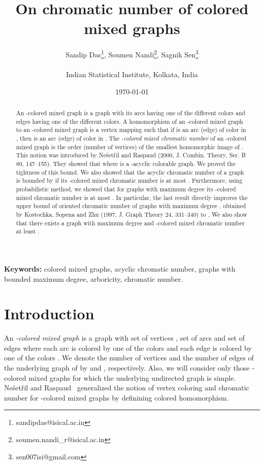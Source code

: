 \documentclass[11pt]{article}
\begin{document}
\title{{\bf On chromatic number of colored mixed graphs}}
\author{
{\sc Sandip Das\footnote{{\small sandipdas@isical.ac.in}}}, {\sc Soumen Nandi\footnote{{\small soumen.nandi\_r@isical.ac.in}}}, {\sc Sagnik Sen\footnote{{\small sen007isi@gmail.com}}}\\
\mbox{}\\
{\small Indian Statistical Institute, Kolkata, India}\\
}




\date{\today}

\maketitle

\begin{abstract}
An -colored mixed graph  is a graph  with its arcs having one of the  different colors and edges having one of the  different colors. A homomorphism  of an -colored mixed graph    to an  -colored mixed graph  is a vertex mapping such that if  is an arc (edge) of color  in , then  is an arc (edge) of  color  in . The \textit{-colored mixed chromatic number}  of an   -colored mixed graph  is the 
order (number of vertices)
of the smallest homomorphic image of . This notion was introduced by 
Ne\v{s}et\v{r}il and Raspaud (2000,  J. Combin. Theory, Ser. B 80, 147--155). 
They showed that  where  is a -acyclic colorable graph.  We proved the tightness of this bound. 
We also showed that the acyclic chromatic number of a graph is bounded by  if its 
-colored mixed chromatic number is at most .  
Furthermore, using probabilistic method, we showed that for graphs with maximum degree  its -colored mixed chromatic number is at most 
. 
In particular, the last result directly improves the upper bound   of oriented chromatic number of 
graphs with  maximum degree , obtained by Kostochka, Sopena and Zhu (1997, J. Graph Theory 24, 331--340)  to . 
We also show that there exists a graph with maximum degree  and -colored mixed chromatic number at least . 
 \end{abstract}


\noindent \textbf{Keywords:} colored mixed graphs, acyclic chromatic number, graphs with bounded maximum degree, arboricity, chromatic number.


\section{Introduction}
An \textit{-colored mixed graph}  is a graph  with set of vertices , set of arcs  and set of edges  where each arc is 
 colored by one of the  colors  and each edge is  colored by one of the  colors . We denote  the number of vertices and the number of edges of the underlying graph of  by   and , respectively.
Also, we will consider only those 
-colored mixed graphs for which the underlying undirected graph is simple.
Ne\v{s}et\v{r}il and Raspaud~\cite{raspaud_and_nesetril} generalized the notion of vertex coloring and chromatic number 
 for -colored mixed graphs
 by definining colored homomorphism. 
\end{document}
